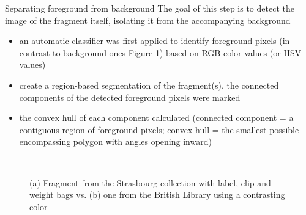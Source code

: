 \documentclass[12pt]{beamer}
\begin{document}
\begin{frame}{Separating foreground from background}
The goal of this step is to detect the image of the fragment itself, isolating it from the accompanying background
\begin{itemize}
\item an automatic classifier was first applied to identify foreground pixels (in contrast to background ones Figure \ref{fig:contrast}) based on RGB color values (or HSV values)
\item create a region-based segmentation of the fragment(s), the connected components of the detected foreground pixels were marked
\item the convex hull of each component calculated (connected component = a contiguous region of foreground pixels; convex hull = the smallest possible encompassing polygon with angles opening inward)
\end{itemize}
\end{frame}

\begin{frame}
\begin{figure}[H]
     \hfill
     \\
     \caption{(a) Fragment from the Strasbourg collection with label, clip and weight bags vs. (b) one from the British Library using a contrasting color}\label{fig:contrast}
\end{figure}
\end{frame}
\end{document}
